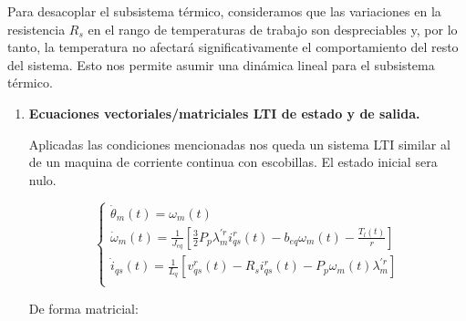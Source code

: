 \documentclass{article}
\begin{document}
Para desacoplar el subsistema térmico, consideramos que las variaciones en la resistencia \(R_s\) 
en el rango de temperaturas de trabajo son despreciables y, por lo tanto, la temperatura no 
afectará significativamente el comportamiento del resto del sistema. Esto nos permite asumir 
una dinámica lineal para el subsistema térmico.

\begin{enumerate}[label=\roman*.]
    \item \textbf{Ecuaciones vectoriales/matriciales LTI de estado y de salida.} 
    
    Aplicadas las condiciones mencionadas nos queda un sistema LTI similar al de un maquina 
    de corriente continua con escobillas. El estado inicial sera nulo.

    \begin{equation}\label{eq.lti}
        \begin{cases}
            \dot{\theta}_{m}(t) = \omega_{m}(t)\\
            \dot{\omega}_{m}(t) = \frac{1}{J_{eq}}[\frac{3}{2}P_{p}\lambda_{m}^{\prime r}i_{qs}^r(t) - b_{eq}\omega_{m}(t) - \frac{T_{l}(t)}{r}]\\
            \dot{i}_{qs}(t) = \frac{1}{L_{q}}[v_{qs}^r(t) - R_{s}i_{qs}^r(t) - P_{p}\omega_{m}(t)\lambda_{m}^{\prime r}]  \\
        \end{cases}
    \end{equation}

    De forma matricial:


\end{enumerate}
\end{document}
